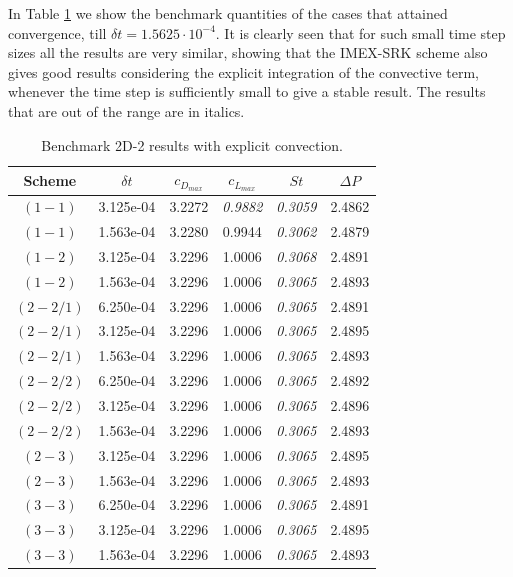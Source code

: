In Table \ref{tab:IMEX-RK_cyl2d_explconv} we show the benchmark quantities of the cases that attained convergence, till $\delta t=1.5625\cdot10^{-4}$. It is clearly seen that for such small time step sizes all the results are very similar, showing that the IMEX-SRK scheme also gives good results considering the explicit integration of the convective term, whenever the time step is sufficiently small to give a stable result. The results that are out of the range are in italics.
\begin{table}[h!]
	\caption{Benchmark 2D-2 results with explicit convection.}
	\label{tab:IMEX-RK_cyl2d_explconv}
	\centering
	\begin{tabular} {cccccc}
		\toprule
			Scheme & $\delta t$ & $c_{D_{max}}$ & $c_{L_{max}}$ & $St$ & $\Delta P$  \\
		\midrule
		\midrule
			$(1-1)$ & 3.125e-04 & 3.2272 & \textit{0.9882} & \textit{0.3059} & 2.4862 \\ 
			$(1-1)$ & 1.563e-04 & 3.2280 & 0.9944 & \textit{0.3062} & 2.4879 \\ 
		\midrule
			$(1-2)$ & 3.125e-04 & 3.2296 & 1.0006 & \textit{0.3068} & 2.4891 \\ 
			$(1-2)$ & 1.563e-04 & 3.2296 & 1.0006 & \textit{0.3065} & 2.4893 \\ 
		\midrule
			$(2-2/1)$ & 6.250e-04 & 3.2296 & 1.0006 & \textit{0.3065} & 2.4891 \\ 
			$(2-2/1)$ & 3.125e-04 & 3.2296 & 1.0006 & \textit{0.3065} & 2.4895 \\ 
			$(2-2/1)$ & 1.563e-04 & 3.2296 & 1.0006 & \textit{0.3065} & 2.4893 \\ 
		\midrule
			$(2-2/2)$ & 6.250e-04 & 3.2296 & 1.0006 & \textit{0.3065} & 2.4892 \\ 
			$(2-2/2)$ & 3.125e-04 & 3.2296 & 1.0006 & \textit{0.3065} & 2.4896 \\ 
			$(2-2/2)$ & 1.563e-04 & 3.2296 & 1.0006 & \textit{0.3065} & 2.4893 \\ 
		\midrule
			$(2-3)$ & 3.125e-04 & 3.2296 & 1.0006 & \textit{0.3065} & 2.4895 \\ 
			$(2-3)$ & 1.563e-04 & 3.2296 & 1.0006 & \textit{0.3065} & 2.4893 \\ 
		\midrule
			$(3-3)$ & 6.250e-04 & 3.2296 & 1.0006 & \textit{0.3065} & 2.4891 \\ 
			$(3-3)$ & 3.125e-04 & 3.2296 & 1.0006 & \textit{0.3065} & 2.4895 \\ 
			$(3-3)$ & 1.563e-04 & 3.2296 & 1.0006 & \textit{0.3065} & 2.4893 \\ 

\end{tabular}
\end{table}
